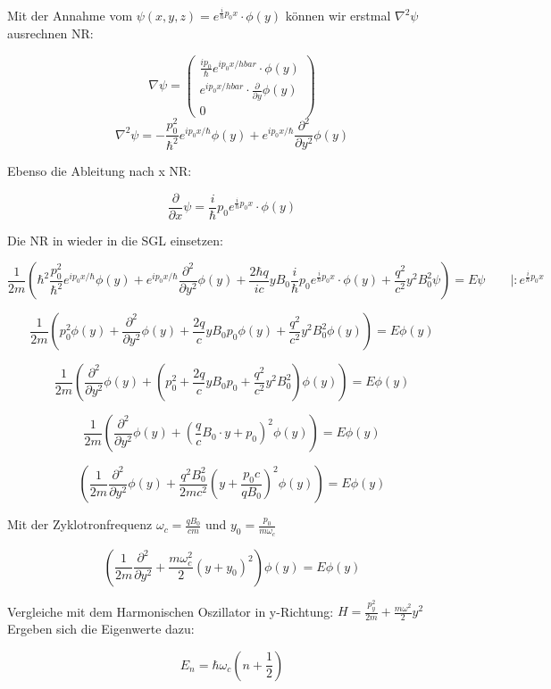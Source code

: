 Mit der Annahme vom \(\psi(x,y,z) = e^{\frac{i}{\hbar}p_0x}\cdot \phi(y)\) können wir erstmal \(\nabla^2\psi\) ausrechnen NR:

\[\nabla\psi = \begin{pmatrix} \frac{ip_0}{\hbar}e^{ip_0x/hbar}\cdot\phi(y)\\ e^{ip_0x/hbar}\cdot\frac{\partial}{\partial y}\phi(y)\\0\end{pmatrix}  \]
\[\nabla^2\psi =- \frac{p_0^2}{\hbar^2}e^{ip_0x/\hbar}\phi(y) + e^{ip_0x/\hbar}\frac{\partial^2}{\partial y^2}\phi(y)  \]

Ebenso die Ableitung nach x NR:

\[\frac{\partial}{\partial x}\psi =\frac{i}{\hbar}p_0 e^{\frac{i}{\hbar}p_0x}\cdot \phi(y) \]


Die NR in wieder in die SGL einsetzen:


\[ \frac{1}{2m}\left(\hbar^2 \frac{p_0^2}{\hbar^2}e^{ip_0x/\hbar}\phi(y) + e^{ip_0x/\hbar}\frac{\partial^2}{\partial y^2}\phi(y)  + \frac{2 \hbar q}{ic} yB_0\frac{i}{\hbar}p_0 e^{\frac{i}{\hbar}p_0x}\cdot \phi(y)  + \frac{q^2}{c^2}y^2B_0^2\psi \right) = E\psi \qquad | :e^{\frac{i}{\hbar}p_0x} \]

\[ \frac{1}{2m}\left(p_0^2\phi(y) + \frac{\partial^2}{\partial y^2}\phi(y)  + \frac{2 q}{c} yB_0p_0  \phi(y)  + \frac{q^2}{c^2}y^2B_0^2\phi(y) \right) = E \phi(y) \]


\[  \frac{1}{2m}\left( \frac{\partial^2}{\partial y^2}\phi(y) +  (p_0^2 + \frac{2 q}{c} yB_0p_0   + \frac{q^2}{c^2}y^2B_0^2)\phi(y) \right) = E \phi(y) \]

\[  \frac{1}{2m}\left( \frac{\partial^2}{\partial y^2}\phi(y) +  (\frac{q}{c}B_0\cdot y +  p_0 )^2\phi(y) \right) = E \phi(y) \]


\[  \left(\frac{1}{2m} \frac{\partial^2}{\partial y^2}\phi(y) + \frac{q^2 B_0^2}{2mc^2} (y +  \frac{p_0c}{qB_0} )^2\phi(y) \right) = E \phi(y) \]


Mit der Zyklotronfrequenz \( \omega_c = \frac{qB_0}{cm} \) und \(y_0 = \frac{p_0}{m\omega_c}\)

\[  \left(\frac{1}{2m} \frac{\partial^2}{\partial y^2} + \frac{m\omega_c^2}{2} (y +  y_0 )^2\right)\phi(y) = E \phi(y) \]


Vergleiche mit dem Harmonischen Oszillator in y-Richtung: \( H = \frac{p^2_y}{2m} + \frac{m\omega^2}{2}y^2 \) Ergeben sich die Eigenwerte dazu:

\[ E_n = \hbar\omega_c(n+\frac{1}{2})\]







